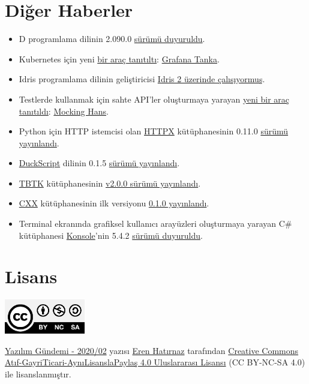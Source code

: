 \documentclass[11pt]{article}
\begin{document}
\section{Diğer Haberler}
\label{sec:org77b434b}
\begin{itemize}
\item D programlama dilinin 2.090.0 \href{https://dlang.org/changelog/2.090.0.html}{sürümü duyuruldu}.
\item Kubernetes için yeni \href{https://grafana.com/blog/2020/01/09/introducing-tanka-our-way-of-deploying-to-kubernetes/}{bir araç tanıtıltı}: \href{https://github.com/grafana/tanka}{Grafana Tanka}.
\item Idris programlama dilinin geliştiricisi \href{https://www.type-driven.org.uk/edwinb/linearity-and-erasure-in-idris-2.html}{Idris 2 üzerinde çalışıyormuş}.
\item Testlerde kullanmak için sahte API'ler oluşturmaya yarayan \href{https://nehalist.io/mocking-hans/}{yeni bir araç
tanıtıldı}: \href{https://github.com/loremipsum/mocking-hans}{Mocking Hans}.
\item Python için HTTP istemcisi olan \href{https://github.com/encode/httpx}{HTTPX} kütüphanesinin 0.11.0 \href{https://github.com/encode/httpx/releases/tag/0.11.0}{sürümü
yayınlandı}.
\item \href{https://github.com/sagiegurari/duckscript}{DuckScript} dilinin 0.1.5 \href{https://github.com/sagiegurari/duckscript/releases/tag/0.1.5}{sürümü yayınlandı}.
\item \href{https://github.com/dafer45/TBTK}{TBTK} kütüphanesinin \href{https://github.com/dafer45/TBTK/releases/tag/v2.0.0}{v2.0.0 sürümü yayınlandı}.
\item \href{https://github.com/dtolnay/cxx}{CXX} kütüphanesinin ilk versiyonu \href{https://github.com/dtolnay/cxx/releases/tag/0.1.0}{0.1.0 yayınlandı}.
\item Terminal ekranında grafiksel kullanıcı arayüzleri oluşturmaya yarayan C\#
kütüphanesi \href{https://github.com/goblinfactory/konsole/}{Konsole}'nin 5.4.2 \href{https://github.com/goblinfactory/konsole/releases/tag/5.4.2}{sürümü duyuruldu}.
\end{itemize}
\section{Lisans}
\label{sec:org14cdb47}
\begin{center}
\begin{center}
\includegraphics[height=1.5cm]{../../../img/CC_BY-NC-SA_4.0.png}
\end{center}

\href{yazilim-gundemi-2020-02.pdf}{Yazılım Gündemi - 2020/02} yazısı \href{https://erenhatirnaz.github.io}{Eren Hatırnaz} tarafından \href{http://creativecommons.org/licenses/by-nc-sa/4.0/}{Creative Commons
Atıf-GayriTicari-AynıLisanslaPaylaş 4.0 Uluslararası Lisansı} (CC BY-NC-SA 4.0)
ile lisanslanmıştır.
\end{center}
\end{document}
